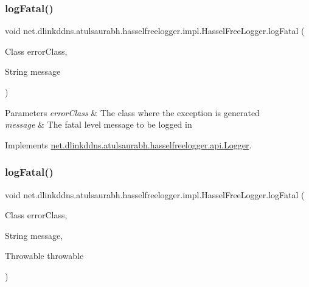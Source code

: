 \subsubsection{\texorpdfstring{log\+Fatal()}{logFatal()}\hspace{0.1cm}{\footnotesize\ttfamily [2/3]}}
{\footnotesize\ttfamily void net.\+dlinkddns.\+atulsaurabh.\+hasselfreelogger.\+impl.\+Hassel\+Free\+Logger.\+log\+Fatal (\begin{DoxyParamCaption}\item[{Class}]{error\+Class,  }\item[{String}]{message }\end{DoxyParamCaption})}


\begin{DoxyParams}{Parameters}
{\em error\+Class} & The class where the exception is generated \\
\hline
{\em message} & The fatal level message to be logged in \\
\hline
\end{DoxyParams}


Implements \mbox{\hyperlink{interfacenet_1_1dlinkddns_1_1atulsaurabh_1_1hasselfreelogger_1_1api_1_1_logger_a05f87f45fe4302254060a2dac3429207}{net.\+dlinkddns.\+atulsaurabh.\+hasselfreelogger.\+api.\+Logger}}.

\mbox{\label{classnet_1_1dlinkddns_1_1atulsaurabh_1_1hasselfreelogger_1_1impl_1_1_hassel_free_logger_a546bc74e8eec8333893e294a98bbe939}} 
\subsubsection{\texorpdfstring{log\+Fatal()}{logFatal()}\hspace{0.1cm}{\footnotesize\ttfamily [3/3]}}
{\footnotesize\ttfamily void net.\+dlinkddns.\+atulsaurabh.\+hasselfreelogger.\+impl.\+Hassel\+Free\+Logger.\+log\+Fatal (\begin{DoxyParamCaption}\item[{Class}]{error\+Class,  }\item[{String}]{message,  }\item[{Throwable}]{throwable }\end{DoxyParamCaption})}


